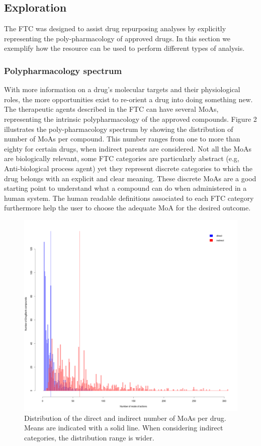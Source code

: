\documentclass{bioinfo}
\begin{document}
\subsection{Exploration}
The FTC was designed to assist drug repurposing analyses by explicitly representing the poly-pharmacology of 
approved drugs. In this section we exemplify how the resource can be used to perform different types of analysis.

\subsubsection{Polypharmacology spectrum}
With more information on a drug’s molecular targets and their physiological roles, the more opportunities 
exist to re-orient a drug into doing something new. The therapeutic agents described in the FTC can have several MoAs, 
representing the intrinsic polypharmacology of the approved compounds. Figure 2 illustrates the poly-pharmacology 
spectrum by showing the distribution of number of MoAs per compound. This number ranges from one to more 
than eighty for certain drugs, when indirect parents are considered. Not all the MoAs are biologically relevant, 
some FTC categories are particularly abstract (e.g, Anti-biological process agent) yet they represent discrete 
categories to which the drug belongs with an explicit and clear meaning. These discrete MoAs are a good starting 
point to understand what a compound can do when administered in a human system. The human readable definitions 
associated to each FTC category furthermore help the user to choose the adequate MoA for the desired outcome.

\begin{figure}[!tpb]%
\centerline{\includegraphics{fig3.png}}
\caption{Distribution of the direct and indirect number of MoAs per drug. 
Means are indicated with a solid line. When considering indirect categories, the distribution range is wider.}\label{fig:03}
\end{figure}
\end{document}
